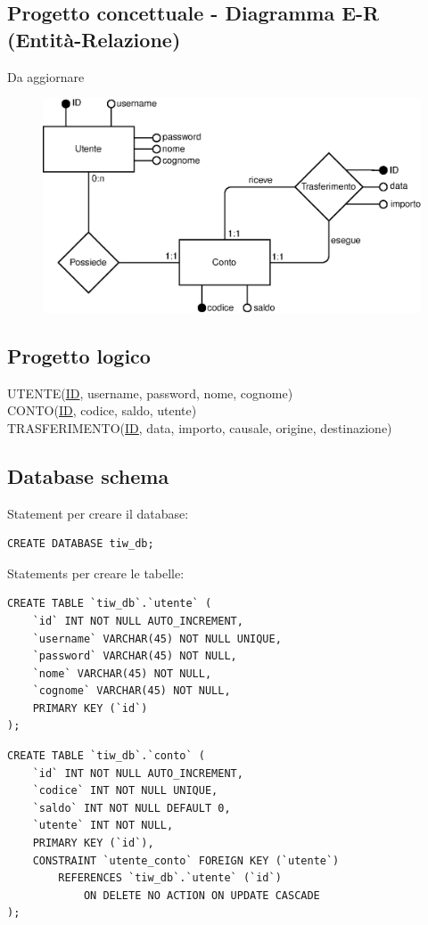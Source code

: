 \documentclass{article}
\begin{document}
\subsection{Progetto concettuale - Diagramma E-R (Entità-Relazione)}
Da aggiornare
\begin{figure}[H]
\centering
\includegraphics[width=1\textwidth]{assets/diagram.eps}
\end{figure}

\subsection{Progetto logico}
UTENTE(\underline{ID}, username, password, nome, cognome)
\\
CONTO(\underline{ID}, codice, saldo, utente)
\\
TRASFERIMENTO(\underline{ID}, data, importo, causale, origine, destinazione)

\subsection{Database schema}
Statement per creare il database:
\begin{verbatim}
CREATE DATABASE tiw_db;
\end{verbatim}

Statements per creare le tabelle:
\begin{verbatim}
CREATE TABLE `tiw_db`.`utente` (
	`id` INT NOT NULL AUTO_INCREMENT,
	`username` VARCHAR(45) NOT NULL UNIQUE,
	`password` VARCHAR(45) NOT NULL,
	`nome` VARCHAR(45) NOT NULL,
	`cognome` VARCHAR(45) NOT NULL,
	PRIMARY KEY (`id`)
);

\end{verbatim}
\pagebreak
\begin{verbatim}
CREATE TABLE `tiw_db`.`conto` (
	`id` INT NOT NULL AUTO_INCREMENT,
	`codice` INT NOT NULL UNIQUE,
	`saldo` INT NOT NULL DEFAULT 0,
	`utente` INT NOT NULL,
	PRIMARY KEY (`id`),
	CONSTRAINT `utente_conto` FOREIGN KEY (`utente`) 
		REFERENCES `tiw_db`.`utente` (`id`) 
			ON DELETE NO ACTION ON UPDATE CASCADE
);
\end{verbatim}
\end{document}
